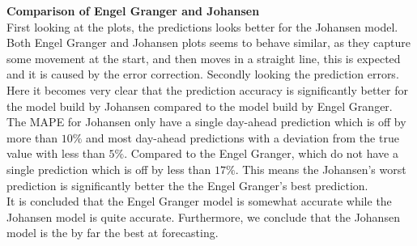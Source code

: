 \noindent \textbf{Comparison of Engel Granger and Johansen}\\

\noindent First looking at the plots, the predictions looks better for the Johansen model. Both Engel Granger and Johansen plots seems to behave similar, as they capture some movement at the start, and then moves in a straight line, this is expected and it is caused by the error correction.
Secondly looking the prediction errors. Here it becomes very clear that the prediction accuracy is significantly better for the model build by Johansen compared to the model build by Engel Granger. The MAPE for Johansen only have a single day-ahead prediction which is off by more than $10\%$ and most day-ahead predictions with a deviation from the true value with less than $5\%$. Compared to the Engel Granger, which do not have a single prediction which is off by less than $17\%$. This means the Johansen's worst prediction is significantly better the the Engel Granger's best prediction.\\
It is concluded that the Engel Granger model is somewhat accurate while the Johansen model is quite accurate. Furthermore, we conclude that the Johansen model is the by far the best at forecasting.